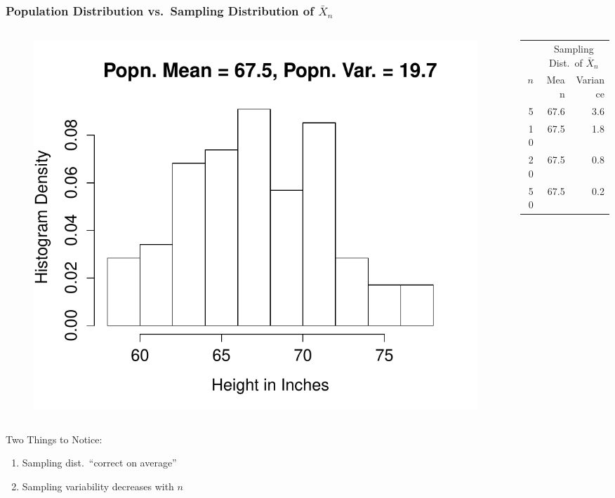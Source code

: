 \documentclass[handout]{beamer}
\begin{document}
\begin{frame}
\frametitle{Population Distribution vs.\ Sampling Distribution of $\bar{X}_n$}

\begin{columns} 
\begin{column}[c]{6cm} 

\begin{figure}
\centering
\includegraphics[scale = 0.35]{./images/height_hist}
\end{figure}
\end{column} 
\begin{column}[c]{6cm} 

 \small
\begin{table}
\begin{tabular}{|rrr|}
\hline
&\multicolumn{2}{c|}{Sampling Dist.\ of $\bar{X}_n$}\\
$n$&Mean&Variance\\
\hline
5&67.6&3.6\\
10&67.5&1.8\\
20&67.5&0.8\\
50&67.5&0.2\\
\hline
\end{tabular}
\end{table}

\end{column} 
\end{columns} 
\begin{alertblock}{Two Things to Notice:}
\begin{enumerate}
	\item Sampling dist.\ ``correct on average'' 
	\item Sampling variability decreases with $n$
\end{enumerate}
\end{alertblock}
\end{frame}
\end{document}
